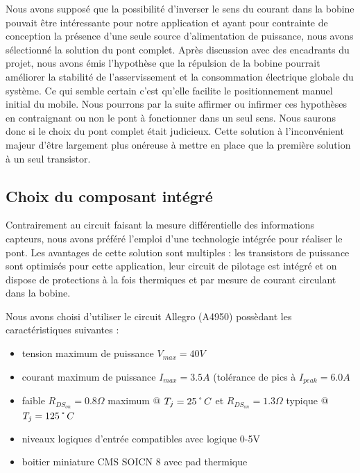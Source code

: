 \documentclass[11pt, french]{article} %
\begin{document}
\medskip
Nous avons supposé que la possibilité d'inverser le sens du courant dans la bobine pouvait être intéressante pour notre application et ayant pour contrainte de conception la présence d'une seule source d'alimentation de puissance, nous avons sélectionné la solution du pont complet. Après discussion avec des encadrants du projet, nous avons émis l'hypothèse que la répulsion de la bobine pourrait améliorer la stabilité de l'asservissement et la consommation électrique globale du système. Ce qui semble certain c'est qu'elle facilite le positionnement manuel initial du mobile. Nous pourrons par la suite affirmer ou infirmer ces hypothèses en contraignant ou non le pont à fonctionner dans un seul sens. Nous saurons donc si le choix du pont complet était judicieux. Cette solution à l'inconvénient majeur d'être largement plus onéreuse à mettre en place que la première solution à un seul transistor.

\subsection{Choix du composant intégré}

Contrairement au circuit faisant la mesure différentielle des informations capteurs, nous avons préféré l'emploi d'une technologie intégrée pour réaliser le pont. Les avantages de cette solution sont multiples : les transistors de puissance sont optimisés pour cette application, leur circuit de pilotage est intégré et on dispose de protections à la fois thermiques et par mesure de courant circulant dans la bobine.

\medskip
\noindent
Nous avons choisi d'utiliser le circuit Allegro (A4950) possèdant les caractéristiques suivantes :
\medskip
\begin{itemize}
	\item tension maximum de puissance $ V_{max} = 40 V $
	\item courant maximum de puissance $ I_{max} = 3.5 A $ \newline
	(tolérance de pics à $ I_{peak} = 6.0 A$
	\item faible $R_{DS_{on}} = 0.8 \Omega $ maximum @ $ T_j = 25 \char23 C $ \newline
	et $R_{DS_{on}} = 1.3 \Omega $ typique @ $ T_j = 125 \char23 C $
	\item niveaux logiques d'entrée compatibles avec logique 0-5V
	\item boitier miniature CMS SOICN 8 avec pad thermique
\end {itemize}
\end{document}
